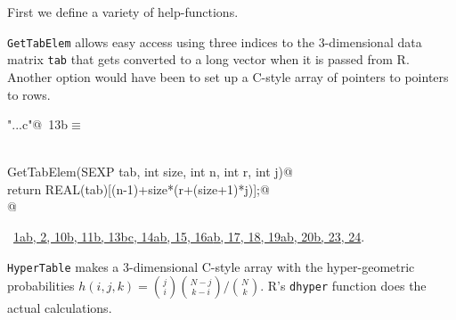 \documentclass[reqno]{amsart}
\renewcommand{\NWtarget}[2]{\hypertarget{#1}{#2}}
\renewcommand{\NWlink}[2]{\hyperlink{#1}{#2}}
\begin{document}
First we define a variety of help-functions.

\texttt{GetTabElem} allows easy
access using three indices to the 3-dimensional data matrix \texttt{tab} that gets 
converted to a long vector when it is passed from R. Another option would have
been to set up a C-style array of pointers to pointers to rows.

\begin{flushleft} \small
\begin{minipage}{\linewidth}\label{scrap21}\raggedright\small
\NWtarget{nuweb13b}{} \verb@"..\src\ReprodCalcs.c"@\nobreak\ {\footnotesize {13b}}$\equiv$
\vspace{-1ex}
\begin{list}{}{} \item
\mbox{}\verb@@\\
\mbox{}\verb@double GetTabElem(SEXP tab, int size, int n, int r, int j){@\\
\mbox{}\verb@         return REAL(tab)[(n-1)+size*(r+(size+1)*j)];@\\
\mbox{}\verb@ }@\\
\mbox{}\verb@@{\NWsep}
\end{list}
\vspace{-1.5ex}
\footnotesize
\begin{list}{}{\setlength{\itemsep}{-\parsep}\setlength{\itemindent}{-\leftmargin}}
\item \NWtxtFileDefBy\ \NWlink{nuweb1a}{1a}\NWlink{nuweb1b}{b}\NWlink{nuweb2}{, 2}\NWlink{nuweb10b}{, 10b}\NWlink{nuweb11b}{, 11b}\NWlink{nuweb13b}{, 13b}\NWlink{nuweb13c}{c}\NWlink{nuweb14a}{, 14a}\NWlink{nuweb14b}{b}\NWlink{nuweb15}{, 15}\NWlink{nuweb16a}{, 16a}\NWlink{nuweb16b}{b}\NWlink{nuweb17}{, 17}\NWlink{nuweb18}{, 18}\NWlink{nuweb19a}{, 19a}\NWlink{nuweb19b}{b}\NWlink{nuweb20b}{, 20b}\NWlink{nuweb23}{, 23}\NWlink{nuweb24}{, 24}.

\item{}
\end{list}
\end{minipage}\vspace{4ex}
\end{flushleft}
\texttt{HyperTable} makes a 3-dimensional C-style array with the hyper-geometric probabilities
$h(i,j,k) =  {\binom{j}{i}}{\binom{N-j}{k-i}} / {\binom{N}{k}}$. R's \texttt{dhyper}
function does the actual calculations.
\end{document}
